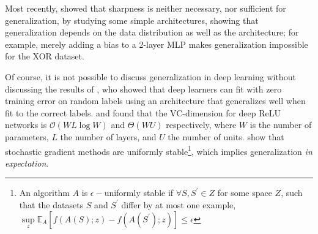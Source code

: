 Most recently, \citet{wen2023sharpness} showed that sharpness is neither necessary, nor sufficient for generalization, by studying some simple architectures, showing that generalization depends on the data distribution as well as the architecture; for example, merely adding a bias to a 2-layer MLP makes generalization impossible for the XOR dataset.
    
Of course, it is not possible to discuss generalization in deep learning without discussing the results of \citet{zhang2021understanding}, who showed that deep learners can fit with zero training error on random labels using an architecture that generalizes well when fit to the correct labels. \citet{bartlett2019nearly} and \citet{harvey2017nearly} found that the VC-dimension for deep ReLU networks is $\mathcal{O}(WL \log W)$ and $\Theta(WU)$ respectively, where $W$ is the number of parameters, $L$ the number of layers, and $U$ the number of units.  \citet{hardt2016train} show that stochastic gradient methods are uniformly stable\footnote{An algorithm $A$ is $\epsilon-$uniformly stable if $\forall S, S^\prime \in Z$ for some space $Z$, such that the datasets $S$ and $S^\prime$ differ by at most one example, $\sup\limits_z \mathbb{E}_A [f(A(S); z) - f(A(S^\prime); z)] \leq \epsilon$}, which implies generalization \textit{in expectation}.